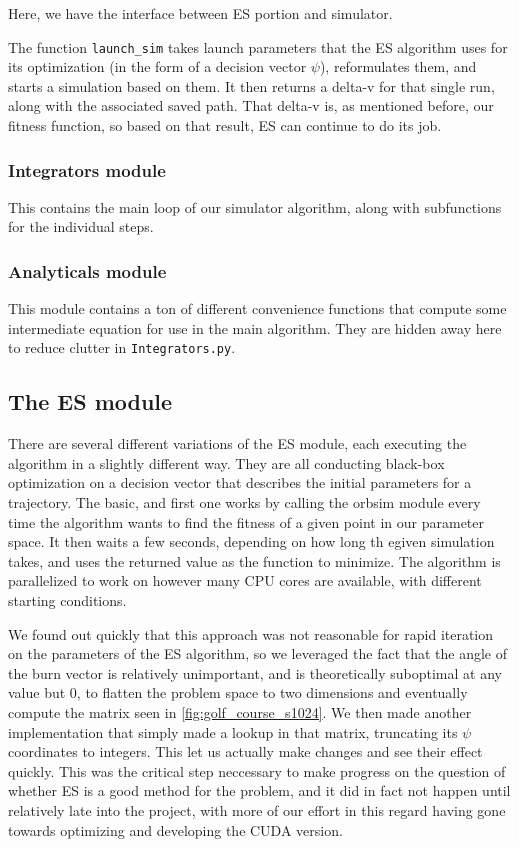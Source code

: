 Here, we have the interface between ES portion and simulator.

\noindent The function \texttt{launch\_sim} takes launch parameters that the ES algorithm uses for its optimization (in the form of a decision vector \(\psi\)), reformulates them, and starts a simulation based on them. It then returns a delta-v for that single run, along with the associated saved path. That delta-v is, as mentioned before, our fitness function, so based on that result, ES can continue to do its job.

\subsubsection{Integrators module}

This contains the main loop of our simulator algorithm, along with subfunctions for the individual steps.

\subsubsection{Analyticals module}

This module contains a ton of different convenience functions that compute some intermediate equation for use in the main algorithm. They are hidden away here to reduce clutter in \texttt{Integrators.py}.

\subsection{The ES module}
There are several different variations of the ES module, each executing the algorithm in a slightly different way. They are all conducting black-box optimization on a decision vector that describes the initial parameters for a trajectory. The basic, and first one works by calling the orbsim module every time the algorithm wants to find the fitness of a given point in our parameter space. It then waits a few seconds, depending on how long th egiven simulation takes, and uses the returned value as the function to minimize. The algorithm is parallelized to work on however many CPU cores are available, with different starting conditions.

We found out quickly that this approach was not reasonable for rapid iteration on the parameters of the ES algorithm, so we leveraged the fact that the angle of the burn vector is relatively unimportant, and is theoretically suboptimal at any value but 0, to flatten the problem space to two dimensions and eventually compute the matrix seen in \cref{fig:golf_course_s1024}. We then made another implementation that simply made a lookup in that matrix, truncating its $\psi$ coordinates to integers. This let us actually make changes and see their effect quickly. This was the critical step neccessary to make progress on the question of whether ES is a good method for the problem, and it did in fact not happen until relatively late into the project, with more of our effort in this regard having gone towards optimizing and developing the CUDA version.

